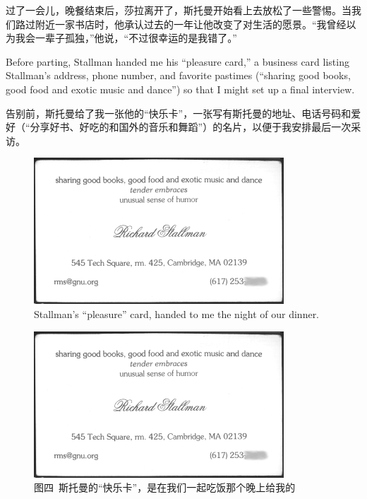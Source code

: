 \ifdefined\chs
过了一会儿，晚餐结束后，莎拉离开了，斯托曼开始看上去放松了一些警惕。当我们路过附近一家书店时，他承认过去的一年让他改变了对生活的愿景。``我曾经以为我会一辈子孤独，''他说，``不过很幸运的是我错了。''
\fi

\ifdefined\eng
Before parting, Stallman handed me his ``pleasure card,'' a business card listing Stallman's address, phone number, and favorite pastimes (``sharing good books, good food and exotic music and dance'') so that I might set up a final interview.
\fi

\ifdefined\chs
告别前，斯托曼给了我一张他的``快乐卡''，一张写有斯托曼的地址、电话号码和爱好（``分享好书、好吃的和国外的音乐和舞蹈''）的名片，以便于我安排最后一次采访。
\fi

\ifdefined\vone
\ifdefined\eng
\begin{figure}[ht] \centering
  \includegraphics[width=\textwidth]{pleasurecard}
  \caption{Stallman's ``pleasure'' card, handed to me the night of our dinner.}
\end{figure}
\fi

\ifdefined\chs
\begin{figure}[ht] \centering
  \includegraphics[width=\textwidth]{pleasurecard}
  \caption{图四\ 斯托曼的``快乐卡''，是在我们一起吃饭那个晚上给我的}
\end{figure}
\fi
\fi

